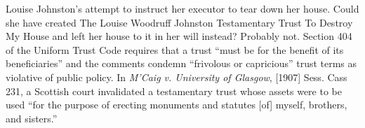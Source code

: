 \item
{} Louise
Johnston's attempt to instruct her executor to tear down her house. Could she
have created The Louise Woodruff Johnston Testamentary Trust To Destroy My House
and left her house to it in her will instead? Probably not. Section 404 of the
Uniform Trust Code requires that a trust ``must be for the benefit of its
beneficiaries'' and the comments condemn ``frivolous or capricious'' trust terms
as violative of public policy. In \textit{M'Caig v. University of Glasgow},
[1907] Sess. Cass 231, a Scottish court invalidated a testamentary trust whose
assets were to be used ``for the purpose of erecting monuments and statutes [of]
myself, brothers, and sisters.''
